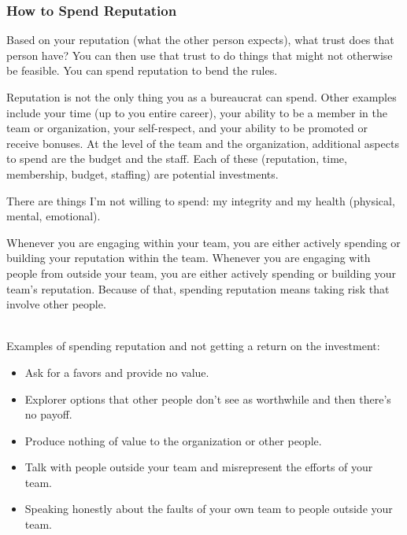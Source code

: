 \subsubsection{How to Spend Reputation}

Based on your reputation (what the other person expects), what trust does that person have?  You can then use that trust to do things that might not otherwise be feasible. You can spend reputation to bend the rules. 

Reputation is not the only thing you as a bureaucrat can spend. Other examples include your time (up to you entire career), your ability to be a member in the team or organization, your self-respect, and your ability to be promoted or receive bonuses. At the level of the team and the organization, additional aspects to spend are the budget and the staff. Each of these (reputation, time, membership, budget, staffing) are potential investments. 

There are things I'm not willing to spend: my integrity and my health (physical, mental, emotional).


Whenever you are engaging within your team, you are either actively spending or building your reputation within the team.
Whenever you are engaging with people from outside your team, you are either actively spending or building your team's reputation.
Because of that, spending reputation means taking risk that involve other people.

\ \\

Examples of spending reputation and not getting a return on the investment:
\begin{itemize}
    \item Ask for a favors and provide no value.
    \item Explorer options that other people don't see as worthwhile and then there's no payoff.
    \item Produce nothing of value to the organization or other people.
    \item Talk with people outside your team and misrepresent the efforts of your team.
    \item Speaking honestly about the faults of your own team to people outside your team.
\end{itemize}












